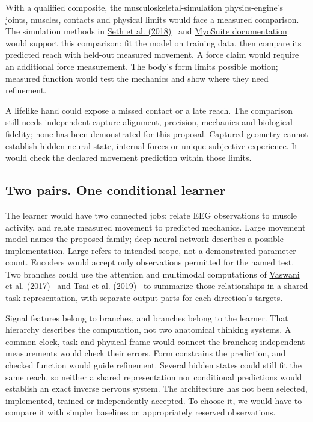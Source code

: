 With a qualified composite, the musculoskeletal-simulation physics-engine's
joints, muscles, contacts and physical limits would face a measured comparison.
The simulation methods in \href{https://journals.plos.org/ploscompbiol/article?id=10.1371/journal.pcbi.1006223}{Seth et al. (2018)}~\cite{opensim2018} and
\href{https://myosuite.readthedocs.io/en/latest/}{MyoSuite documentation}~\cite{myosuiteDocsUndated} would support this comparison: fit the model on training
data, then compare its predicted reach with held-out measured movement. A force claim would require an additional force
measurement. The body's form limits possible motion; measured function would
test the mechanics and show where they need refinement.


A lifelike hand could expose a missed contact or a late reach. The comparison
still needs independent capture alignment, precision, mechanics and biological
fidelity; none has been demonstrated for this proposal. Captured geometry
cannot establish hidden neural state, internal forces or unique subjective
experience. It would check the declared movement prediction within those limits.

\subsection{Two pairs. One conditional learner}
The learner would have two connected jobs: relate EEG observations to muscle
activity, and relate measured movement to predicted mechanics. Large movement
model names the proposed family; deep neural network describes a possible
implementation. Large refers to intended scope, not a demonstrated parameter
count. Encoders would accept only observations permitted for the named test.
Two branches could use the attention and multimodal computations of
\href{https://arxiv.org/html/1706.03762v7}{Vaswani et al. (2017)}~\cite{vaswani2017} and \href{https://aclanthology.org/P19-1656/}{Tsai et al. (2019)}~\cite{tsai2019} to summarize those relationships
in a shared task representation, with separate output parts for each direction's targets.


Signal features belong to branches, and branches belong to the learner.
That hierarchy describes the computation, not two anatomical thinking systems.
A common clock, task and physical frame would connect the branches; independent
measurements would check their errors. Form constrains the prediction, and
checked function would guide refinement. Several hidden states could still
fit the same reach, so neither a shared representation nor conditional
predictions would establish an exact inverse nervous system. The architecture
has not been selected, implemented, trained or independently accepted.
To choose it, we would have to compare it with simpler baselines on
appropriately reserved observations.

